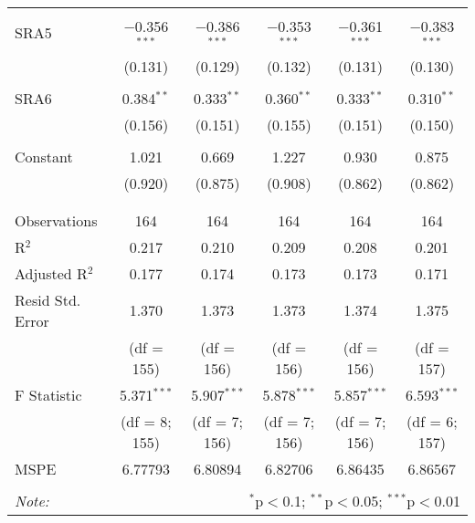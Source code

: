 \begin{table}[H]
\begin{adjustbox}{width=\textwidth}
\begin{tabular}{@{\extracolsep{5pt}}lccccc}
  & & & & & \\ 
 SRA5 & $-$0.356$^{***}$ & $-$0.386$^{***}$ & $-$0.353$^{***}$ & $-$0.361$^{***}$ & $-$0.383$^{***}$ \\ 
  & (0.131) & (0.129) & (0.132) & (0.131) & (0.130) \\ 
  & & & & & \\ 
 SRA6 & 0.384$^{**}$ & 0.333$^{**}$ & 0.360$^{**}$ & 0.333$^{**}$ & 0.310$^{**}$ \\ 
  & (0.156) & (0.151) & (0.155) & (0.151) & (0.150) \\ 
  & & & & & \\ 
 Constant & 1.021 & 0.669 & 1.227 & 0.930 & 0.875 \\ 
  & (0.920) & (0.875) & (0.908) & (0.862) & (0.862) \\ 
  & & & & & \\ 
\hline \\[-1.8ex] 
Observations & 164 & 164 & 164 & 164 & 164 \\ 
R$^{2}$ & 0.217 & 0.210 & 0.209 & 0.208 & 0.201 \\ 
Adjusted R$^{2}$ & 0.177 & 0.174 & 0.173 & 0.173 & 0.171 \\ 
Resid Std. Error & 1.370  & 1.373 & 1.373  & 1.374  & 1.375 \\ 
& (df = 155) & (df = 156) & (df = 156) & (df = 156) & (df = 157) \\
F Statistic & 5.371$^{***}$  & 5.907$^{***}$  & 5.878$^{***}$  & 5.857$^{***}$  & 6.593$^{***}$  \\
& (df = 8; 155) & (df = 7; 156) & (df = 7; 156) & (df = 7; 156) & (df = 6; 157) \\
MSPE & 6.77793 & 6.80894 & 6.82706 & 6.86435 & 6.86567 \\
\hline 
\hline \\[-1.8ex] 
\textit{Note:}  & \multicolumn{5}{r}{$^{*}$p$<$0.1; $^{**}$p$<$0.05; $^{***}$p$<$0.01} \\ 
\end{tabular} 
\end{adjustbox}
\end{table} 


